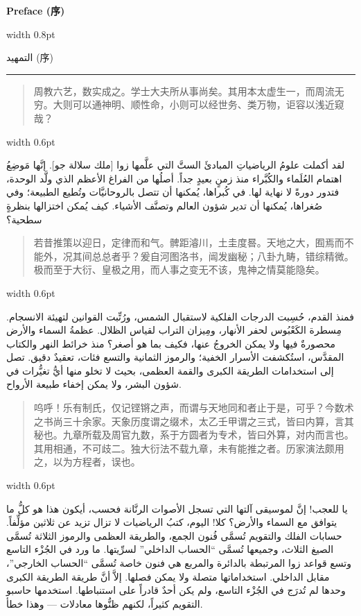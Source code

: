 \documentclass[11pt,a4paper]{article}
\newlength{\cnwidth}
\newlength{\arwidth}
\newcommand{\paralleltext}[2]{%
  \par\medskip\noindent
  \begin{minipage}[t]{\cnwidth}%
    \small #1%
  \end{minipage}%
  \hfill\textcolor{colrule}{\vrule width 0.6pt}\hfill
  \begin{minipage}[t]{\arwidth}%
    \small\arabicfont\beginR #2\endR%
  \end{minipage}%
  \par\medskip
}
\newcommand{\parallelsection}[2]{%
  \par\bigskip\noindent
  \begin{minipage}[t]{\cnwidth}%
    \Large\bfseries\color{sectioncolor} #1%
  \end{minipage}%
  \hfill\textcolor{colrule}{\vrule width 0.8pt}\hfill
  \begin{minipage}[t]{\arwidth}%
    \Large\arabicfontbf\color{sectioncolor}\beginR #2\endR%
  \end{minipage}%
  \par\medskip\noindent\textcolor{colrule}{\rule{\textwidth}{0.6pt}}\par\medskip
}
\newenvironment{cnquote}{\begin{quote}\color{prefacecolor}}{\end{quote}}
\begin{document}
\newpage

\parallelsection{Preface (序)}{التمهيد (序)}

\paralleltext{%
\begin{cnquote}
周教六艺，数实成之。学士大夫所从事尚矣。其用本太虚生一，而周流无穷。大则可以通神明、顺性命，小则可以经世务、类万物，讵容以浅近窥哉？
\end{cnquote}%
}{%
لقد أكملت علومُ الرياضياتِ المبادئَ الستَّ التي علَّمها زوا [ملك سلالة جو]. إنَّها مَوضِعُ اهتمام العُلَماء والكُبَّراء منذ زمنٍ بعيدٍ جداً. أصلُها من الفراغ الأعظم الذي ولَّد الوحدة، فتدور دورةً لا نهاية لها. في كُبراها، يُمكنها أن تتصل بالروحانيَّات وتُطيع الطبيعة؛ وفي صُغراها، يُمكنها أن تدير شؤون العالم وتصنَّف الأشياء. كيف يُمكن اختزالها بنظرةٍ سطحية؟
}

\paralleltext{%
\begin{cnquote}
若昔推策以迎日，定律而和气。髀距濬川，土圭度晷。天地之大，囿焉而不能外，况其间总总者乎？爰自河图洛书，闿发幽秘；八卦九畴，错综精微。极而至于大衍、皇极之用，而人事之变无不该，鬼神之情莫能隐矣。
\end{cnquote}%
}{%
فمنذ القدم، حُسِبت الدرجات الفلكية لاستقبال الشمس، ورُتِّبت القوانين لتهيئة الانسجام. مِسطرة الكَعْبُوس لحفر الأنهار، ومِيزان التراب لقياس الظلال. عظمةُ السماء والأرض محصورةٌ فيها ولا يمكن الخروجُ عنها، فكيف بما هو أصغر؟ منذ خرائط النهر والكتاب المقدَّس، استُكشفت الأسرار الخفية؛ والرموز الثمانية والتسع فئات، تعقيدٌ دقيق. تصل إلى استخدامات الطريقة الكبرى والقمة العظمى، بحيث لا تخلو منها أيُّ تغيُّرات في شؤون البشر، ولا يمكن إخفاء طبيعة الأرواح.
}

\paralleltext{%
\begin{cnquote}
呜呼！乐有制氏，仅记铿锵之声，而谓与天地同和者止于是，可乎？今数术之书尚三十余家。天象历度谓之缀术，太乙壬甲谓之三式，皆曰内算，言其秘也。九章所载及周官九数，系于方圆者为专术，皆曰外算，对内而言也。其用相通，不可歧二。独大衍法不载九章，未有能推之者。历家演法颇用之，以为方程者，误也。
\end{cnquote}%
}{%
يا للعجب! إنَّ لموسيقى آلتها التي تسجل الأصوات الرنَّانة فحسب، أيكون هذا هو كلُّ ما يتوافق مع السماء والأرض؟ كلا! اليوم، كتبُ الرياضيات لا تزال تزيد عن ثلاثين مؤلِّفاً. حسابات الفلك والتقويم تُسمَّى فُنون الجمع، والطريقة العظمى والرموز الثلاثة تُسمَّى الصيغ الثلاث، وجميعها تُسمَّى ``الحساب الداخلي'' لسرِّيتها. ما ورد في الجُزْء التاسع وتسع قواعد زوا المرتبطة بالدائرة والمربع هي فنون خاصة تُسمَّى ``الحساب الخارجي''، مقابل الداخلي. استخداماتها متصلة ولا يمكن فصلها. إلاَّ أنَّ طريقة الطريقة الكبرى وحدها لم تُدرَج في الجُزْء التاسع، ولم يكن أحدٌ قادراً على استنباطها. استخدمها حاسبو التقويم كثيراً، لكنهم ظنُّوها معادلات — وهذا خطأ.
}
\end{document}

